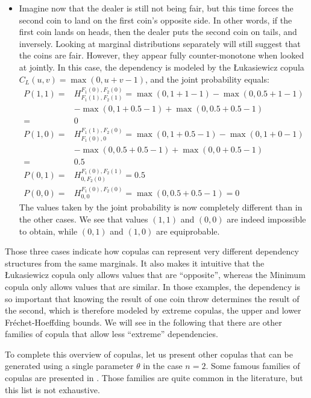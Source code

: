 \begin{example}
\begin{itemize}
		\item Imagine now that the dealer is still not being fair, but this time forces the second coin to land on the first coin's opposite side. In other words, if the first coin lands on heads, then the dealer puts the second coin on tails, and inversely. Looking at marginal distributions separately will still suggest that the coins are fair. However, they appear fully counter-monotone when looked at jointly. In this case, the dependency is modeled by the \L ukasiewicz copula $C_L(u,v)=\max(0,u+v-1)$, and the joint probability equals:
		\begin{align*}
            P(1,1) =& H_{F_1(1), F_2(1)}^{F_1(0), F_2(0)} = \max(0, 1+1-1) - \max(0, 0.5+1-1)\\
            &- \max(0, 1+0.5-1) + \max(0, 0.5+0.5-1)\\
            =& 0\\
            P(1,0) =& H_{F_1(0), 0}^{F_1(1), F_2(0)} =\max(0, 1+0.5-1) - \max(0, 1+0-1)\\
            &- \max(0, 0.5+0.5-1) + \max(0, 0+0.5-1)\\
            =& 0.5\\
            P(0,1) =& H_{0, F_2(0)}^{F_1(0), F_2(1)} = 0.5 \\
            P(0,0) =& H_{0, 0}^{F_1(0), F_2(0)} = \max(0, 0.5+0.5-1)=0
        \end{align*}
        The values taken by the joint probability is now completely different than in the other cases. We see that values $(1,1)$ and $(0,0)$ are indeed impossible to obtain, while $(0,1)$ and $(1,0)$ are equiprobable.
	\end{itemize}
	Those three cases indicate how copulas can represent very different dependency structures from the same marginals. It also makes it intuitive that the \L ukasiewicz copula only allows values that are ``opposite'', whereas the Minimum copula only allows values that are similar. In those examples, the dependency is so important that knowing the result of one coin throw determines the result of the second, which is therefore modeled by extreme copulas, \ie the upper and lower Fréchet-Hoeffding bounds.  We will see in the following that there are other families of copula that allow less ``extreme'' dependencies.
\end{example}

To complete this overview of copulas, let us present other copulas that can be generated using a single parameter $\theta$ in the case $n=2$. Some famous families of copulas are presented in . Those families are quite common in the literature, but this list is not exhaustive.

